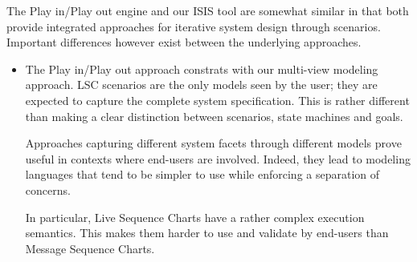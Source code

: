 The Play in/Play out engine and our ISIS tool are somewhat similar in that both provide integrated approaches for iterative system design through scenarios. Important differences however exist between the underlying approaches.
\begin{itemize}
\item The Play in/Play out approach constrats with our multi-view modeling approach. LSC scenarios are the only models seen by the user; they are expected to capture the complete system specification. This is rather different than making a clear distinction between scenarios, state machines and goals. 

Approaches capturing different system facets through different models prove useful in contexts where end-users are involved. Indeed, they lead to modeling languages that tend to be simpler to use while enforcing a separation of concerns. 

In particular, Live Sequence Charts have a rather complex execution semantics. This makes them harder to use and validate by end-users than Message Sequence Charts.
\end{itemize}
